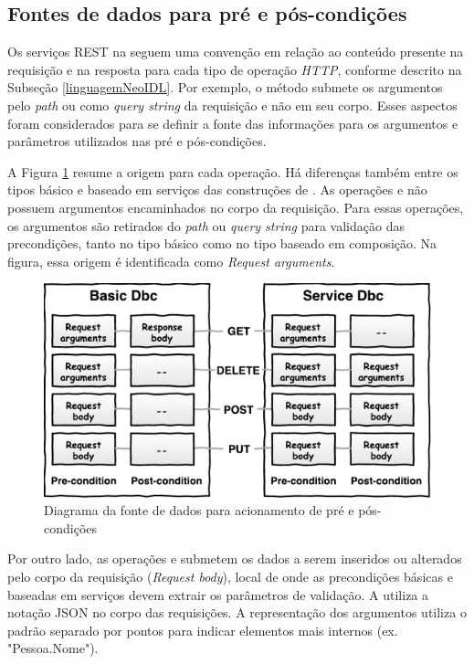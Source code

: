 \subsection{Fontes de dados para pré e pós-condições}
\label{FonteDadosDbc}

Os serviços REST na \neoidl{} seguem uma convenção em relação ao conteúdo
presente na requisição e na resposta para cada tipo de operação \emph{HTTP},
conforme descrito na Subseção \ref{linguagemNeoIDL}. Por exemplo, o método 
submete os argumentos pelo \emph{path} ou como \textit{query string} da
requisição e não em seu corpo. Esses aspectos foram considerados para se definir
a fonte das informações para os argumentos e parâmetros utilizados nas pré e
pós-condições.

A Figura \ref{Fig:FonteDadosDbcNeoIDL} resume a origem para cada operação. Há
diferenças também entre os tipos básico e baseado em serviços das construções de
\designbycontract{}. As operações  e  não possuem
argumentos encaminhados no corpo da requisição. Para essas operações, os
argumentos são retirados do \emph{path} ou \emph{query string} para
va\-li\-da\-ção das precondições, tanto no tipo básico como no tipo baseado em
composição. Na figura, essa origem é identificada como \textit{Request arguments}.

\begin{figure}[!htb]
\centering
\includegraphics[width=120mm,trim = 0mm 0mm 0mm
0mm,clip]{img/FonteDadosDbcNeoIDLIngles.pdf}
\caption{Diagrama da fonte de dados para acionamento de pré e pós-condições}
\label{Fig:FonteDadosDbcNeoIDL}
\end{figure}


Por outro lado, as operações  e  submetem os dados a
serem inseridos ou alterados pelo corpo da requisição (\textit{Request body}),
local de onde as precondições básicas e baseadas em serviços devem extrair os
parâmetros de validação.
A \neoidl{} utiliza a notação JSON\cite{JSon} no corpo das requisições. A
representação dos argumentos utiliza o padrão separado por pontos para indicar
elementos mais internos (ex. "Pessoa.Nome").

